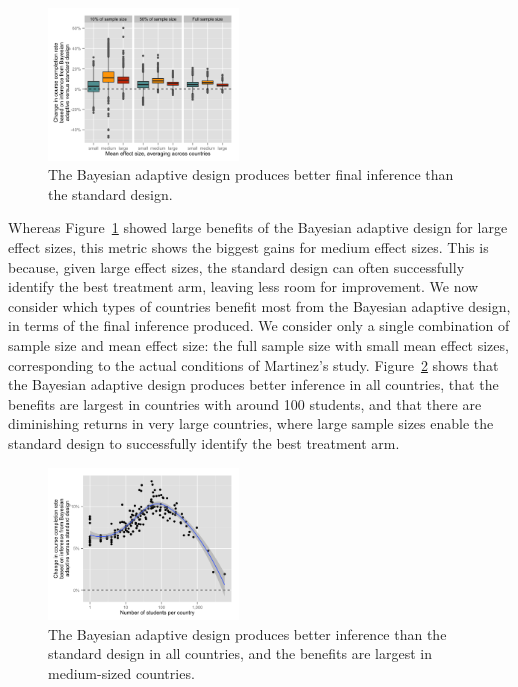 \documentclass{acm_proc_article-sp}
\begin{document}
\begin{figure}
\centering
\includegraphics[width=0.45\textwidth]{fig4}
\caption{The Bayesian adaptive design produces better final inference than the standard design.}
\label{fig:4}
\end{figure}

Whereas Figure~\ref{fig:4} showed large benefits of the Bayesian adaptive design for large effect sizes, this metric shows the biggest gains for medium effect sizes. This is because, given large effect sizes, the standard design can often successfully identify the best treatment arm, leaving less room for improvement. 
We now consider which types of countries benefit most from the Bayesian adaptive design, in terms of the final inference produced. We consider only a single combination of sample size and mean effect size: the full sample size with small mean effect sizes, corresponding to the actual conditions of Martinez's study. Figure~\ref{fig:5} shows that the Bayesian adaptive design produces better inference in all countries, that the benefits are largest in countries with around 100 students, and that there are diminishing returns in very large countries, where large sample sizes enable the standard design to successfully identify the best treatment arm. 

\begin{figure}
\centering
\includegraphics[width=0.45\textwidth]{fig5}
\caption{The Bayesian adaptive design produces better inference than the standard design in all countries, and the benefits are largest in medium-sized countries.}
\label{fig:5}
\end{figure}
\end{document}
